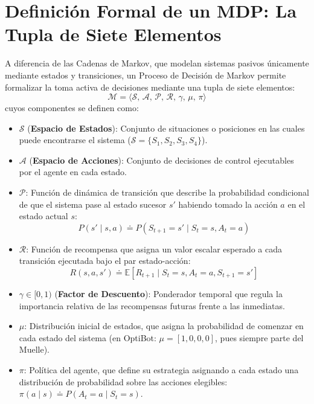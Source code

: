 \section{Definición Formal de un MDP: La Tupla de Siete Elementos}
A diferencia de las Cadenas de Markov, que modelan sistemas pasivos únicamente mediante estados y transiciones, un Proceso de Decisión de Markov permite formalizar la toma activa de decisiones mediante una tupla de siete elementos:
\begin{equation}
  \mathcal{M} = \langle \mathcal{S}, \, \mathcal{A}, \, \mathcal{P}, \, \mathcal{R}, \, \gamma, \, \mu, \, \pi \rangle
\end{equation}
cuyos componentes se definen como:
\begin{itemize}
  \item $\mathcal{S}$ (\textbf{Espacio de Estados}): Conjunto de situaciones o posiciones en las cuales puede encontrarse el sistema ($\mathcal{S} = \{S_1, S_2, S_3, S_4\}$).
  \item $\mathcal{A}$ (\textbf{Espacio de Acciones}): Conjunto de decisiones de control ejecutables por el agente en cada estado.
  \item $\mathcal{P}$: Función de dinámica de transición que describe la probabilidad condicional de que el sistema pase al estado sucesor $s'$ habiendo tomado la acción $a$ en el estado actual $s$:
  \begin{equation}
    P(s' \mid s, a) \doteq P(S_{t+1} = s' \mid S_t = s, A_t = a)
  \end{equation}
  \item $\mathcal{R}$: Función de recompensa que asigna un valor escalar esperado a cada transición ejecutada bajo el par estado-acción:
  \begin{equation}
    R(s, a, s') \doteq \mathbb{E}[R_{t+1} \mid S_t = s, A_t = a, S_{t+1} = s']
  \end{equation}
  \item $\gamma \in [0, 1)$ (\textbf{Factor de Descuento}): Ponderador temporal que regula la importancia relativa de las recompensas futuras frente a las inmediatas.
  \item $\mu$: Distribución inicial de estados, que asigna la probabilidad de comenzar en cada estado del sistema (en OptiBot: $\mu = [1, 0, 0, 0]$, pues siempre parte del Muelle).
  \item $\pi$: Política del agente, que define su estrategia asignando a cada estado una distribución de probabilidad sobre las acciones elegibles: $\pi(a \mid s) \doteq P(A_t = a \mid S_t = s)$.
\end{itemize}

